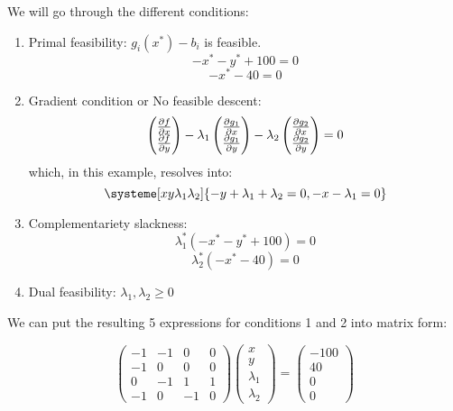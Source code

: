 \begin{center}
\end{center}

We will go through the different conditions:

\begin{enumerate}
  \item Primal feasibility:  $g_i(x^*)-b_i$ is feasible. 
  \[-x^* -y^* +100 =0\]
  \[-x^*-40=0\]
  \item Gradient condition or No feasible descent:  
  \[ \begin{pmatrix}\pdv{f}{x}\\\pdv{f}{y}\end{pmatrix} 
  -\lambda_1 \begin{pmatrix}\pdv{g_1}{x}\\\pdv{g_1}{y}\end{pmatrix}
  -\lambda_2 \begin{pmatrix}\pdv{g_2}{x}\\\pdv{g_2}{y}\end{pmatrix} =0\]
  which, in this example, resolves into:
  \[\systeme[xy\lambda_1\lambda_2]{-y+\lambda_1+\lambda_2=0,-x-\lambda_1=0 }\]
  \item Complementariety slackness: 
  \[\lambda_1^* (-x^* -y^* +100)=0\]
  \[\lambda_2^* (-x^*-40)=0\]
  \item Dual feasibility: $\lambda_1,\lambda_2\geq 0$
\end{enumerate}

We can put the resulting 5 expressions for conditions 1 and 2 into matrix form:

\[
  \begin{pmatrix} -1 & -1 & 0&0\\ -1&0&0&0\\ 0&-1&1&1\\ -1&0&-1&0 \end{pmatrix}
  \begin{pmatrix} x\\y\\\lambda_1\\\lambda_2\end{pmatrix}=
  \begin{pmatrix} -100\\ 40\\0\\0 \end{pmatrix}
\]

